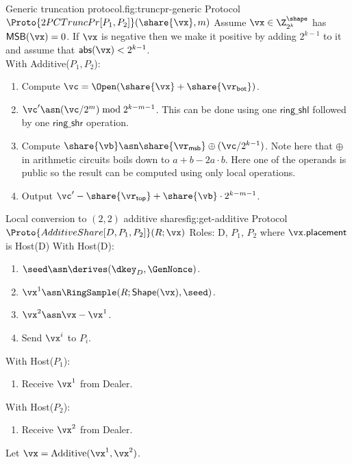 \begin{Boxfig}{Generic truncation protocol.}{fig:truncpr-generic}
  {Protocol $\Proto{2PCTruncPr[P_1, P_2]}(\share{\vx}, m)$}
  Assume $\vx \in \Z_{2^k}^{\shape}$ has $\mathsf{MSB}(\vx) = 0$. If $\vx$ is negative then
  we make it positive by adding $2^{k-1}$ to it and assume that $\mathsf{abs}(\vx) < 2^{k-1}$.
  \\
  With Additive($P_1,P_2$):
  \begin{enumerate}
    \item Compute $\vc = \Open(\share{\vx} + \share{\vr_{\mathsf{bot}}})$.
    \item $\vc' \asn (\vc/2^m) \bmod 2^{k-m-1}$. This can be done using one $\mathsf{ring\_shl}$
    followed by one $\mathsf{ring\_shr}$ operation.
    \item Compute $\share{\vb} \asn \share{\vr_{\mathsf{msb}}} \oplus (\vc / 2^{k-1})$. Note here that $\oplus$
    in arithmetic circuits boils down to $a + b - 2a\cdot b$. Here one of the operands is public so
    the result can be computed using only local operations.
    \item Output $\vc' - \share{\vr_{\mathsf{top}}} + \share{\vb} \cdot 2^{k-m-1}$.
 \end{enumerate}

\end{Boxfig}


\begin{Boxfig}{Local conversion to $(2,2)$ additive shares}{fig:get-additive}
  {Protocol $\Proto{AdditiveShare[D, P_1, P_2]}(R; \vx)$}
  Roles: D, $P_1$, $P_2$ where $\vx.\mathsf{placement}$ is Host(D) \newline
  With Host(D):
  \begin{enumerate}
    \item $\seed \asn \derives(\dkey_D, \GenNonce)$.
    \item $\vx^1 \asn \RingSample(R; \mathsf{Shape}(\vx), \seed)$.
    \item $\vx^2 \asn \vx - \vx^1$.
    \item Send $\vx^i$ to $P_i$.
  \end{enumerate}
  With Host($P_1$):
  \begin{enumerate}
      \item Receive $\vx^1$ from Dealer.
  \end{enumerate}
  With Host($P_2$):
  \begin{enumerate}
      \item Receive $\vx^2$ from Dealer.
  \end{enumerate}
  Let $\vx = \text{Additive}(\vx^1, \vx^2)$.
\end{Boxfig}

